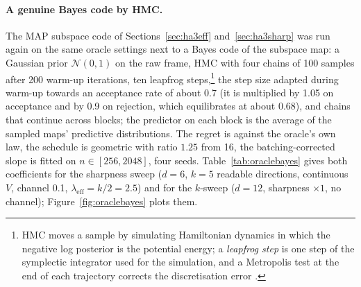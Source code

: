 \documentclass[11pt,a4paper]{article}
\begin{document}
\paragraph{A genuine Bayes code by HMC.} The MAP subspace code of Sections~\ref{sec:ha3eff} and~\ref{sec:ha3sharp} was run again on the same oracle settings next to a Bayes code of the subspace map: a Gaussian prior $\mathcal N(0,1)$ on the raw frame, HMC with four chains of 100 samples after 200 warm-up iterations, ten leapfrog steps,\footnote{HMC moves a sample by simulating Hamiltonian dynamics in which the negative log posterior is the potential energy; a \emph{leapfrog step} is one step of the symplectic integrator used for the simulation, and a Metropolis test at the end of each trajectory corrects the discretisation error \cite{neal2011hmc}.} the step size adapted during warm-up towards an acceptance rate of about 0.7 (it is multiplied by 1.05 on acceptance and by 0.9 on rejection, which equilibrates at about 0.68), and chains that continue across blocks; the predictor on each block is the average of the sampled maps' predictive distributions. The regret is against the oracle's own law, the schedule is geometric with ratio $1.25$ from 16, the batching-corrected slope is fitted on $n\in[256,2048]$, four seeds. Table~\ref{tab:oraclebayes} gives both coefficients for the sharpness sweep ($d=6$, $k=5$ readable directions, continuous $V$, channel 0.1, $\lambda_{\mathrm{eff}}=k/2=2.5$) and for the $k$-sweep ($d=12$, sharpness $\times1$, no channel); Figure~\ref{fig:oraclebayes} plots them.
\end{document}
